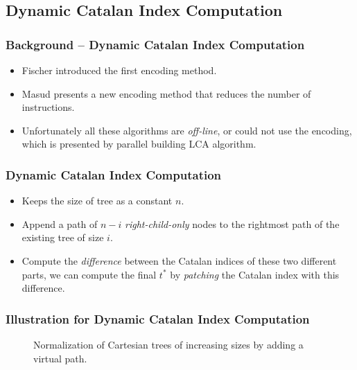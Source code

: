 \subsection{Dynamic Catalan Index Computation}
\begin{frame}
	\frametitle{Background -- Dynamic Catalan Index Computation}
	\begin{itemize}
		\setlength\itemsep{1em}
	 	\item 
	 		Fischer introduced the first encoding method.
		\item
			Masud presents a new encoding method that reduces the number
			of instructions.
		\item 
			Unfortunately all these algorithms are {\em off-line}, or
			could not use the encoding, which is presented by parallel
			building LCA algorithm.
	\end{itemize}
\end{frame}

\begin{frame}
	\frametitle{Dynamic Catalan Index Computation}
	\begin{itemize}
		\setlength\itemsep{1em}
	 	\item 
	 		Keeps the size of tree as a constant $n$.
	 	\item
	 		Append a path of $n-i$ {\em right-child-only} nodes to the
			rightmost path of the existing tree of size $i$.
		\item
			Compute the {\em difference} between the Catalan indices of
			these two different parts, we can compute the final $t^*$ by
			{\em patching} the Catalan index with this difference.
	\end{itemize}
\end{frame}

\begin{frame}
	\frametitle{Illustration for Dynamic Catalan Index Computation}
	\begin{center}
		\scalebox{0.8} { \begin{minipage}{1.3\textwidth}
			\begin{figure}[!thb]
			  \centering {}  
			  \caption{Normalization of Cartesian trees of increasing sizes by
			    adding a virtual path.}
			  \label{fig:cartesianEncoding}
			\end{figure}
			\end{minipage}
		}
	\end{center}
\end{frame}

